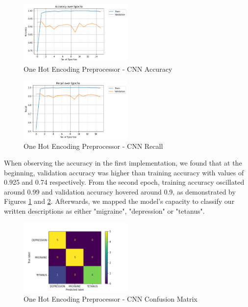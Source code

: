 \documentclass[12pt]{report}
\begin{document}
\begin{figure}[H]
	\centering
	\includegraphics[width=0.5\textwidth]{accuracy.png}
	\caption{One Hot Encoding Preprocessor - CNN Accuracy}
	\label{fig:ohep-acc}
\end{figure}

\begin{figure}[H]
	\centering
	\includegraphics[width=0.5\textwidth]{recall.png}
	\caption{One Hot Encoding Preprocessor - CNN Recall}
	\label{fig:ohep-rec}
\end{figure}

When observing the accuracy in the first implementation,
we found that at the beginning, validation accuracy was higher than training
accuracy with values of 0.925 and 0.74 respectively. From the second epoch,
training accuracy oscillated around 0.99 and validation accuracy hovered around
0.9, as demonstrated by Figures \ref{fig:ohep-acc} and \ref{fig:ohep-rec}. 
Afterwards, we mapped the
model's capacity to classify our written descriptions as either "migraine", "depression" or "tetanus".

\begin{figure}[H]
	\centering
	\includegraphics[width=0.5\textwidth]{confusion_matrix_ohe.png}
	\caption{One Hot Encoding Preprocessor - CNN Confusion Matrix}
	\label{fig:ohep-con}
\end{figure}
\end{document}
